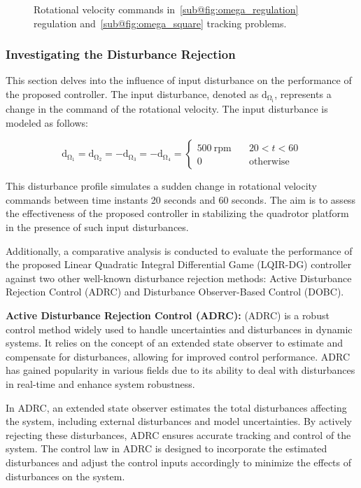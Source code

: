 \documentclass[3p]{elsarticle}
\begin{document}
\begin{figure}[H]
    \caption{Rotational velocity  commands in~\ref{sub@fig:omega_regulation} regulation and~\ref{sub@fig:omega_square} tracking problems.}
    \label{fig:omega}
\end{figure}
\subsubsection{Investigating the Disturbance Rejection}\label{sec:disturbance}
\noindent This section delves into the influence of input disturbance on the performance of the proposed controller. The input disturbance, denoted as $\mathrm{d_{\Omega_i}}$, represents a change in the command of the rotational velocity. The input disturbance is modeled as follows:

\begin{equation}
    \mathrm{d_{\Omega_1}} = \mathrm{d_{\Omega_2}} = -\mathrm{d_{\Omega_3}} = -\mathrm{d_{\Omega_4}} = \begin{cases}
        500~{\mathrm{rpm}} \quad &20<t<60\\
        0 \quad &\mathrm{otherwise}
    \end{cases}
\end{equation}

This disturbance profile simulates a sudden change in rotational velocity commands between time instants 20 seconds and 60 seconds. The aim is to assess the effectiveness of the proposed controller in stabilizing the quadrotor platform in the presence of such input disturbances.

Additionally, a comparative analysis is conducted to evaluate the performance of the proposed Linear Quadratic Integral Differential Game (LQIR-DG) controller against two other well-known disturbance rejection methods: Active Disturbance Rejection Control (ADRC) and Disturbance Observer-Based Control (DOBC).

\textbf{Active Disturbance Rejection Control (ADRC):}
(ADRC) is a robust control method widely used to handle uncertainties and disturbances in dynamic systems. It relies on the concept of an extended state observer to estimate and compensate for disturbances, allowing for improved control performance. ADRC has gained popularity in various fields due to its ability to deal with disturbances in real-time and enhance system robustness.

In ADRC, an extended state observer estimates the total disturbances affecting the system, including external disturbances and model uncertainties. By actively rejecting these disturbances, ADRC ensures accurate tracking and control of the system. The control law in ADRC is designed to incorporate the estimated disturbances and adjust the control inputs accordingly to minimize the effects of disturbances on the system.
\end{document}

